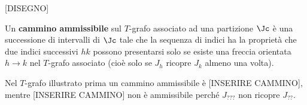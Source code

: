 [DISEGNO]

\begin{definition}
Un \textbf{cammino ammissibile} sul $T$-grafo associato ad una partizione $\Jc$ \`e una successione di intervalli di $\Jc$ tale che la sequenza di indici ha la propriet\`a che due indici successivi $hk$ possono presentarsi solo se esiste una freccia orientata $h\to k$ nel $T$-grafo associato (cio\`e solo se $J_h$ ricopre $J_k$ almeno una volta).
\end{definition}

\begin{example}
Nel $T$-grafo illustrato prima un cammino ammissibile \`e [INSERIRE CAMMINO], mentre [INSERIRE CAMMINO] non \`e ammissibile perch\'e $J_{???}$ non ricopre $J_{??}$.
\end{example}

